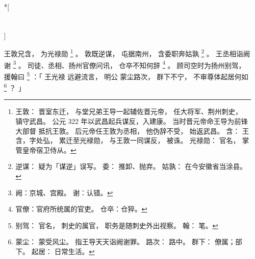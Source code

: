 
\switchcolumn[0]*[\section{}]

王敦兄含，
为光禄勋%
\footnote{%
    王敦：
        晋室东迁，
        与堂兄弟王导一起辅佐晋元帝，
        任大将军、荆州刺史，
        镇守武昌。
        公元 322 年以武昌起兵谋反，入建康。
        当时晋元帝命王导为前锋大部督
        抵抗王敦。
        后元帝任王敦为丞相，
        他伪辞不受，
        始返武昌。
    含：
        王含，字处弘，
        累迁至光䘵勋，
        与王敦一同谋反，
        被诛。
    光禄勋：
        官名，
        掌管皇帝宿卫侍从。
}%
。
敦既逆谋，
屯据南州，
含委职奔姑孰%
\footnote{%
    逆谋：
        疑为「谋逆」误写。
    委：
        推卸、抛弃。
    姑孰：
        在今安徽省当涂县。
        
}%
。
王丞相诣阙谢%
\footnote{%
    阙：京城、宫殿。
    谢：认错。
}%
。
司徒、丞相、扬州官僚问讯，
仓卒不知何辞%
\footnote{%
    官僚：官府所统属的官吏。
    仓卒：仓猝。
}%
。
顾司空时为扬州别驾，
援翰曰%
\footnote{%
    别驾：
        官名，
        刺史的属官，
        职务是随刺史外出视察。
    翰：
        笔。
}%
：「
    王光禄
    远避流言，
    明公
    蒙尘路次，
    群下不宁，
    不审尊体起居何如%
    \footnote{%
        蒙尘：
            蒙受风尘。
            指王导天天诣阙谢罪。
        路次：
            路中。
        群下：
            僚属；部下。
        起居：
            日常生活。
    }%
    ？
」

\switchcolumn



